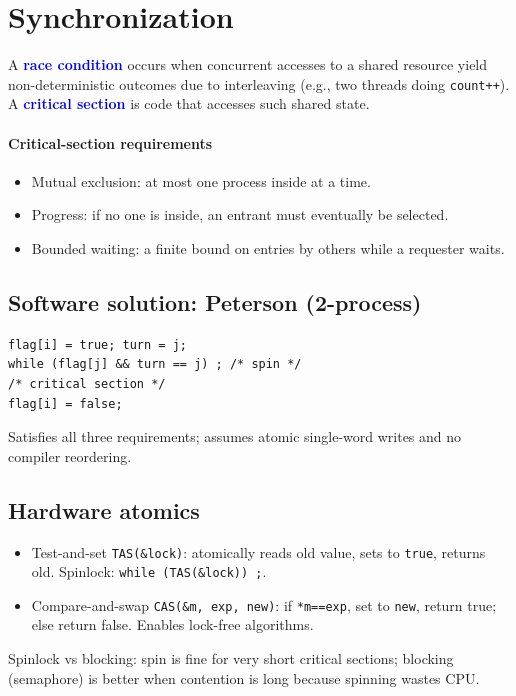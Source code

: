 \section{Synchronization}
A \textcolor{Blue}{\textbf{race condition}} occurs when concurrent accesses to a shared resource yield non-deterministic outcomes due to interleaving (e.g., two threads doing \texttt{count++}).
A \textcolor{Blue}{\textbf{critical section}} is code that accesses such shared state.

\paragraph{Critical-section requirements}
\begin{itemize}
  \item \textcolor{Bittersweet}{Mutual exclusion}: at most one process inside at a time.
  \item \textcolor{Bittersweet}{Progress}: if no one is inside, an entrant must eventually be selected.
  \item \textcolor{Bittersweet}{Bounded waiting}: a finite bound on entries by others while a requester waits.
\end{itemize}

\subsection{Software solution: Peterson (2-process)}
\begin{verbatim}
flag[i] = true; turn = j;
while (flag[j] && turn == j) ; /* spin */
/* critical section */
flag[i] = false;
\end{verbatim}
Satisfies all three requirements; assumes atomic single-word writes and no compiler reordering.

\subsection{Hardware atomics}
\begin{itemize}
  \item \textcolor{Bittersweet}{Test-and-set} \texttt{TAS(\&lock)}: atomically reads old value, sets to \texttt{true}, returns old. Spinlock: \texttt{while (TAS(\&lock)) ;}.
  \item \textcolor{Bittersweet}{Compare-and-swap} \texttt{CAS(\&m, exp, new)}: if \texttt{*m==exp}, set to \texttt{new}, return true; else return false. Enables lock-free algorithms.
\end{itemize}
\textcolor{Bittersweet}{Spinlock vs blocking}: spin is fine for very short critical sections; blocking (semaphore) is better when contention is long because spinning wastes CPU.


